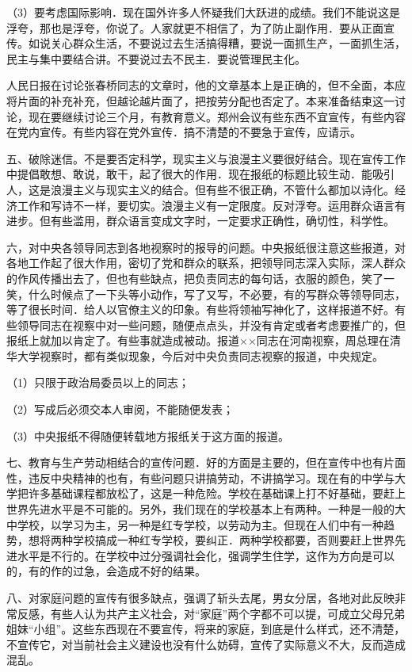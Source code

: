 （3）要考虑国际影响．现在国外许多人怀疑我们大跃进的成绩。我们不能说这是浮夸，那也是浮夸，你说了。人家就更不相信了，为了防止副作用．要从正面宣传。如说关心群众生活，不要说过去生活搞得糟，要说一面抓生产，一面抓生活，民主与集中要结合讲。不要说过去不民主．要说管理民主化。

人民日报在讨论张春桥同志的文章时，他的文章基本上是正确的，但不全面，本应将片面的补充补充，但越论越片面了，把按劳分配也否定了。本来准备结束这一讨论，现在要继续讨论三个月，有教育意义。郑州会议有些东西不宜宣传，有些内容在党内宣传。有些内容在党外宣传．搞不清楚的不要急于宣传，应请示。

五、破除迷信。不是要否定科学，现实主义与浪漫主义要很好结合。现在宣传工作中提倡敢想、敢说，敢干，起了很大的作用．现在报纸的标题比较生动．能吸引人，这是浪漫主义与现实主义的结合。但有些不很正确，不管什么都加以诗化。经济工作和写诗不一样，要切实。浪漫主义有一定限度。反对浮夸。运用群众语言有进步。但有些滥用，群众语言变成文字时，一定要求正确性，确切性，科学性。

六，对中央各领导同志到各地视察时的报导的问题。中央报纸很注意这些报道，对各地工作起了很大作用，密切了党和群众的联系，把领导同志深入实际，深人群众的作风传播出去了，但也有些缺点，把负责同志的每句话，衣服的颜色，笑了一笑，什么时候点了一下头等小动作，写了又写，不必要，有的写群众等领导同志，等了很长时间．给人以官僚主义的印象。有些将领袖写神化了，这样报道不好。有些领导同志在视察中对一些问题，随便点点头，并没有肯定或者考虑要推广的，但报纸上就加以肯定了。有些事就造成被动。报道××同志在河南视察，周总理在清华大学视察时，都有类似现象，今后对中央负责同志视察的报道，中央规定。

（1）只限于政治局委员以上的同志；

（2）写成后必须交本人审阅，不能随便发表；

（3）中央报纸不得随便转载地方报纸关于这方面的报道。

七、教育与生产劳动相结合的宣传问题．好的方面是主要的，但在宣传中也有片面性，违反中央精神的也有，有些问题只讲搞劳动，不讲搞学习。现在有的中学与大学把许多基础课程都放松了，这是一种危险。学校在基础课上打不好基础，要赶上世界先进水平是不可能的。另外，我们现在的学校基本上有两种。一种是一般的大中学校，以学习为主，另一种是红专学校，以劳动为主。但现在人们中有一种趋势，想将两种学校搞成一种红专学校，要纠正．两种学校都要，否则要赶上世界先进水平是不行的。在学校中过分强调社会化，强调学生住学，这作为方向是可以的，有的作的过急，会造成不好的结果。

八、对家庭问题的宣传有很多缺点，强调了斩头去尾，男女分居，各地对此反映非常反感，有些人认为共产主义社会，对“家庭”两个字都不可以提，可成立父母兄弟姐妹“小组”。这些东西现在不要宣传，将来的家庭，到底是什么样式，还不清楚，不宣传它，对当前社会主义建设也没有什么妨碍，宣传了实际意义不大，反而造成混乱。

